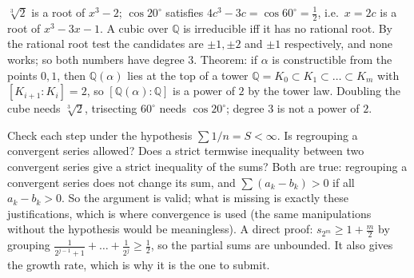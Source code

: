 \documentclass[11pt,a4paper]{article}
\begin{document}
 $\sqrt[3]2$ is a root of $x^3-2$; $\cos20^\circ$ satisfies $4c^3-3c=\cos60^\circ=\frac12$, i.e.\ $x=2c$ is a root of $x^3-3x-1$. A cubic over $\mathbb Q$ is irreducible iff it has no rational root.
 By the rational root test the candidates are $\pm1,\pm2$ and $\pm1$ respectively, and none works; so both numbers have degree $3$.
 Theorem: if $\alpha$ is constructible from the points $0,1$, then $\mathbb Q(\alpha)$ lies at the top of a tower $\mathbb Q=K_0\subset K_1\subset\dots\subset K_m$ with $[K_{i+1}:K_i]=2$, so $[\mathbb Q(\alpha):\mathbb Q]$ is a power of $2$ by the tower law. Doubling the cube needs $\sqrt[3]2$, trisecting $60^\circ$ needs $\cos20^\circ$; degree $3$ is not a power of $2$.

 Check each step under the hypothesis $\sum1/n=S<\infty$. Is regrouping a convergent series allowed? Does a strict termwise inequality between two convergent series give a strict inequality of the sums?
 Both are true: regrouping a convergent series does not change its sum, and $\sum(a_k-b_k)>0$ if all $a_k-b_k>0$. So the argument is valid; what is missing is exactly these justifications, which is where convergence is used (the same manipulations without the hypothesis would be meaningless).
 A direct proof: $s_{2^m}\ge1+\frac m2$ by grouping $\frac1{2^{j-1}+1}+\dots+\frac1{2^j}\ge\frac12$, so the partial sums are unbounded. It also gives the growth rate, which is why it is the one to submit.
\end{document}
